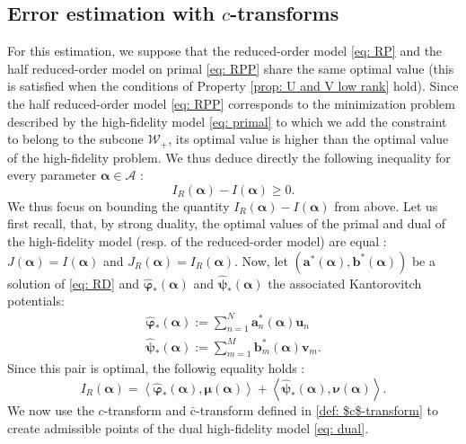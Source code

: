 \documentclass{article}
\def\cA{\mathcal{A}}
\def\cW{\mathcal{W}}
\def\aalpha{\boldsymbol{\alpha}}
\def\pphi{\boldsymbol{\varphi}}
\def\ppsi{\boldsymbol{\psi}}
\def\mmu{\boldsymbol{\mu}}
\def\nnu{\boldsymbol{\nu}}
\def\aa{\mathbf{a}}
\def\bb{\mathbf{b}}
\def\uu{\mathbf{u}}
\def\vv{\mathbf{v}}
\begin{document}
\subsection{Error estimation with \texorpdfstring{$c$}{}-transforms}\label{subsection : error approximation $c$-transform}
%
For this estimation, we suppose that the reduced-order model \eqref{eq: RP} and the half reduced-order model on primal \eqref{eq: RPP} share the same optimal value (this is satisfied when the conditions of Property \ref{prop: U and V low rank} hold). Since the half reduced-order model \eqref{eq: RPP} corresponds to the minimization problem described by the high-fidelity model \eqref{eq: primal} to which we add the constraint to belong to the subcone $\cW_+$, its optimal value is higher than the optimal value of the high-fidelity problem. We thus deduce directly the following inequality for every parameter $\aalpha \in \cA$ : 
%
\begin{equation}
    I_R(\aalpha) - I(\aalpha) \geq 0.
\end{equation}
%
 We thus focus on bounding the quantity $ I_R(\aalpha) - I(\aalpha) $ from above.
Let us first recall, that, by strong duality, the optimal values of the primal and dual of the high-fidelity model (resp. of the reduced-order model) are equal : $J(\aalpha) = I(\aalpha)$ and $J_R(\aalpha) = I_R(\aalpha)$. %
Now, let $(\aa^*(\aalpha), \bb^*(\aalpha))$ be a solution of \eqref{eq: RD}  and $\widehat{\pphi}_*(\aalpha)$ and $\widehat{\ppsi}_*(\aalpha)$ the associated Kantorovitch potentials:
%
\begin{equation} \label{eq: bound below phi psi definition}
    \begin{array}{ll}
         \displaystyle  \widehat{\pphi}_*(\aalpha) := \sum_{n =1}^N \aa^*_n(\aalpha) \uu_n \\
         \displaystyle  \widehat{\ppsi}_*(\aalpha) := \sum_{m =1}^M \bb^*_m(\aalpha) \vv_m .
    \end{array}
\end{equation}
%
Since this pair is optimal, the followig equality holds :
%
\begin{equation} \label{eq: proof reduced cost}
    I_R(\aalpha) = \left\langle \widehat{\pphi}_*(\aalpha), \mmu(\aalpha) \right\rangle + \left\langle \widehat{\ppsi}_*(\aalpha), \nnu(\aalpha) \right\rangle .
\end{equation}
%
We now use the $c$-transform and $\bar{\mathrm{c}}$-transform defined in \ref{def: $c$-transform} to create admissible points of the dual high-fidelity model \eqref{eq: dual}.
\end{document}
